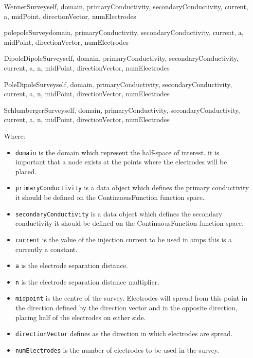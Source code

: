 \begin{classdesc}{WennerSurvey}{self, domain, primaryConductivity, secondaryConductivity,
current, a, midPoint, directionVector, numElectrodes}
\end{classdesc}

\begin{classdesc}{polepoleSurvey}{domain, primaryConductivity, secondaryConductivity, 
current, a, midPoint, directionVector, numElectrodes}
\end{classdesc}

\begin{classdesc}{DipoleDipoleSurvey}{self, domain, primaryConductivity, secondaryConductivity,
current, a, n, midPoint, directionVector, numElectrodes}
\end{classdesc}

\begin{classdesc}{PoleDipoleSurvey}{self, domain, primaryConductivity, secondaryConductivity,
current, a, n, midPoint, directionVector, numElectrodes}
\end{classdesc}

\begin{classdesc}{SchlumbergerSurvey}{self, domain, primaryConductivity, secondaryConductivity,
current, a, n, midPoint, directionVector, numElectrodes}
\end{classdesc}

\noindent Where:
\begin{itemize}
\item \texttt{domain} is the domain which represent the half-space of interest. 
it is important that a node exists at the points where the electrodes will be placed.
\item \texttt{primaryConductivity} is a data object which defines the primary conductivity
it should be defined on the ContinuousFunction function space.
\item \texttt{secondaryConductivity} is a data object which defines the secondary conductivity
it should be defined on the ContinuousFunction function space.
\item \texttt{current} is the value of the injection current to be used in amps this is a currently a
constant.
\item \texttt{a} is the electrode separation distance.
\item \texttt{n} is the electrode separation distance multiplier.
\item \texttt{midpoint} is the centre of the survey. Electrodes will spread from this point
in the direction defined by the direction vector and in the opposite direction, placing
half of the electrodes on either side.
\item \texttt{directionVector} defines as the direction in which electrodes are spread.
\item \texttt{numElectrodes} is the number of electrodes to be used in the survey.
\end{itemize} 

